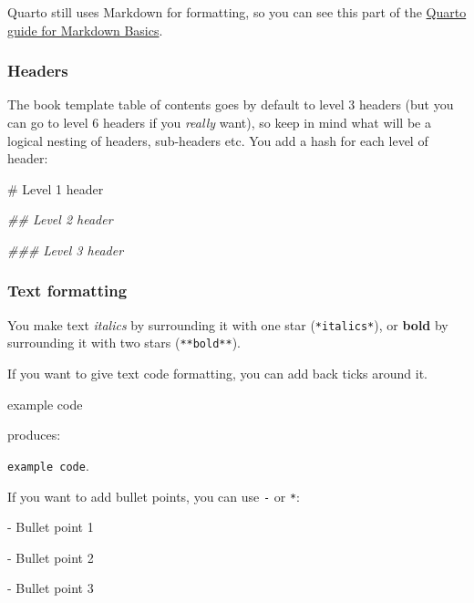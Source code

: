 \documentclass[
  letterpaper,
  DIV=11,
  numbers=noendperiod]{scrreprt}
\newenvironment{Shaded}{\begin{snugshade}}{\end{snugshade}}
\newcommand{\AttributeTok}[1]{\textcolor[rgb]{0.40,0.45,0.13}{#1}}
\newcommand{\CommentTok}[1]{\textcolor[rgb]{0.37,0.37,0.37}{#1}}
\newcommand{\DecValTok}[1]{\textcolor[rgb]{0.68,0.00,0.00}{#1}}
\newcommand{\DocumentationTok}[1]{\textcolor[rgb]{0.37,0.37,0.37}{\textit{#1}}}
\newcommand{\NormalTok}[1]{\textcolor[rgb]{0.00,0.23,0.31}{#1}}
\newcommand{\SpecialCharTok}[1]{\textcolor[rgb]{0.37,0.37,0.37}{#1}}
\newcommand{\StringTok}[1]{\textcolor[rgb]{0.13,0.47,0.30}{#1}}
\begin{document}
Quarto still uses Markdown for formatting, so you can see this part of
the \href{https://quarto.org/docs/authoring/markdown-basics.html}{Quarto
guide for Markdown Basics}.

\subsubsection{Headers}\label{headers}

The book template table of contents goes by default to level 3 headers
(but you can go to level 6 headers if you \emph{really} want), so keep
in mind what will be a logical nesting of headers, sub-headers etc. You
add a hash for each level of header:

\begin{Shaded}
\begin{Highlighting}[]
\CommentTok{\# Level 1 header}

\DocumentationTok{\#\# Level 2 header}

\DocumentationTok{\#\#\# Level 3 header}
\end{Highlighting}
\end{Shaded}

\subsubsection{Text formatting}\label{text-formatting}

You make text \emph{italics} by surrounding it with one star
(\texttt{*italics*}), or \textbf{bold} by surrounding it with two stars
(\texttt{**bold**}).

If you want to give text code formatting, you can add back ticks around
it.

\begin{Shaded}
\begin{Highlighting}[]
\StringTok{\textasciigrave{}}\AttributeTok{example code}\StringTok{\textasciigrave{}}
\end{Highlighting}
\end{Shaded}

produces:

\texttt{example\ code}.

If you want to add bullet points, you can use \texttt{-} or \texttt{*}:

\begin{Shaded}
\begin{Highlighting}[]
\SpecialCharTok{{-}}\NormalTok{ Bullet point }\DecValTok{1}

\SpecialCharTok{{-}}\NormalTok{ Bullet point }\DecValTok{2}

\SpecialCharTok{{-}}\NormalTok{ Bullet point }\DecValTok{3}
\end{Highlighting}
\end{Shaded}
\end{document}
